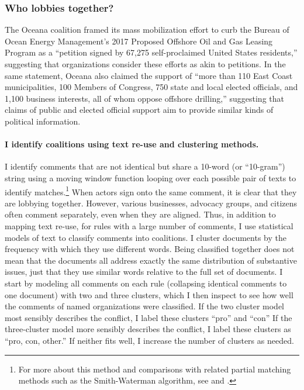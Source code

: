 \documentclass[
      12pt,
        ]{article}
\begin{document}
\hypertarget{who-lobbies-together}{%
\subsubsection{Who lobbies together?}\label{who-lobbies-together}}

The Oceana coalition framed its mass mobilization effort to curb the
Bureau of Ocean Energy Management's 2017 Proposed Offshore Oil and Gas
Leasing Program as a ``petition signed by 67,275 self-proclaimed United
States residents,'' suggesting that organizations consider these efforts
as akin to petitions. In the same statement, Oceana also claimed the
support of ``more than 110 East Coast municipalities, 100 Members of
Congress, 750 state and local elected officials, and 1,100 business
interests, all of whom oppose offshore drilling,'' suggesting that claims
of public and elected official support aim to provide similar kinds of
political information.

\hypertarget{i-identify-coalitions-using-text-re-use-and-clustering-methods.}{%
\paragraph{I identify coalitions using text re-use and clustering methods.}\label{i-identify-coalitions-using-text-re-use-and-clustering-methods.}}

I identify comments that are not identical but share a 10-word (or
``10-gram'') string using a moving window function looping over each
possible pair of texts to identify matches.\footnote{For more about this method and comparisons with related partial matching methods such as the Smith-Waterman algorithm, see \citet{Casas2017} and \citet{Judge-Lord2017}.}
When actors sign onto the same comment, it is clear that they are
lobbying together. However, various businesses, advocacy groups, and
citizens often comment separately, even when they are aligned. Thus, in addition to mapping text re-use, for rules with a large number of comments,
I use statistical models of text to classify comments into coalitions. I cluster
documents by the frequency with which they use different words. Being
classified together does not mean that the documents all address exactly
the same distribution of substantive issues, just that they use similar
words relative to the full set of documents. I start by modeling all
comments on each rule (collapsing identical comments to one document)
with two and three clusters, which I then inspect to see how well the
comments of named organizations were classified. If the two cluster
model most sensibly describes the conflict, I label these clusters ``pro'' and ``con'' If the three-cluster model more sensibly describes the
conflict, I label these clusters as ``pro, con, other.'' If neither fits
well, I increase the number of clusters as needed.
\end{document}
